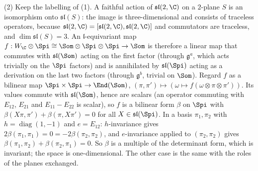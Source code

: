 (2) Keep the labelling of (1). A faithful action of $\mathfrak{sl}(2,\C)$ on a $2$-plane $S$ is an isomorphism onto $\mathfrak{sl}(S)$: the image is three-dimensional and consists of traceless operators, because $\mathfrak{sl}(2,\C) = [\mathfrak{sl}(2,\C), \mathfrak{sl}(2,\C)]$ and commutators are traceless, and $\dim\mathfrak{sl}(S) = 3$. An $\mathfrak{l}$-equivariant map $f: W_\C\otimes\Spi \cong \Som\otimes\Spi\otimes\Spi \to \Som$ is therefore a linear map that commutes with $\mathfrak{sl}(\Som)$ acting on the first factor (through $\mathfrak{g}^a$, which acts trivially on the $\Spi$ factors) and is annihilated by $\mathfrak{sl}(\Spi)$ acting as a derivation on the last two factors (through $\mathfrak{g}^b$, trivial on $\Som$). Regard $f$ as a bilinear map $\Spi\times\Spi \to \End(\Som)$, $(\pi,\pi') \mapsto (\omega \mapsto f(\omega\otimes\pi\otimes\pi'))$. Its values commute with $\mathfrak{sl}(\Som)$, hence are scalars (an operator commuting with $E_{12}$, $E_{21}$ and $E_{11} - E_{22}$ is scalar), so $f$ is a bilinear form $\beta$ on $\Spi$ with $\beta(X\pi, \pi') + \beta(\pi, X\pi') = 0$ for all $X \in \mathfrak{sl}(\Spi)$. In a basis $\pi_1, \pi_2$ with $h = \operatorname{diag}(1,-1)$ and $e = E_{12}$: $h$-invariance gives $2\beta(\pi_1,\pi_1) = 0 = -2\beta(\pi_2,\pi_2)$, and $e$-invariance applied to $(\pi_2, \pi_2)$ gives $\beta(\pi_1,\pi_2) + \beta(\pi_2,\pi_1) = 0$. So $\beta$ is a multiple of the determinant form, which is invariant; the space is one-dimensional. The other case is the same with the roles of the planes exchanged.
